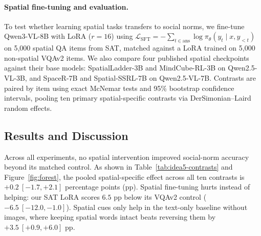 \paragraph{Spatial fine-tuning and evaluation.}
To test whether learning spatial tasks transfers to social norms, we fine-tune Qwen3-VL-8B with LoRA ($r{=}16$) using $\mathcal L_{\mathrm{SFT}}=-\sum_{t\in\mathrm{ans}}\log\pi_\theta(y_t\mid x,y_{<t})$ on 5,000 spatial QA items from SAT, matched against a LoRA trained on 5,000 non-spatial VQAv2 items. We also compare four published spatial checkpoints against their base models: SpatialLadder-3B and MindCube-RL-3B on Qwen2.5-VL-3B, and SpaceR-7B and Spatial-SSRL-7B on Qwen2.5-VL-7B. Contrasts are paired by item using exact McNemar tests and 95\% bootstrap confidence intervals, pooling ten primary spatial-specific contrasts via DerSimonian--Laird random effects.

\subsection{Results and Discussion}
\label{sec:idea5-results}

Across all experiments, no spatial intervention improved social-norm accuracy beyond its matched control. As shown in Table~\ref{tab:idea5-contrasts} and Figure~\ref{fig:forest}, the pooled spatial-specific effect across all ten contrasts is $+0.2\ [-1.7,+2.1]$ percentage points (pp). Spatial fine-tuning hurts instead of helping: our SAT LoRA scores $6.5$ pp below its VQAv2 control ($-6.5\ [-12.0,-1.0]$). Spatial cues only help in the text-only baseline without images, where keeping spatial words intact beats reversing them by $+3.5\ [+0.9,+6.0]$ pp.

